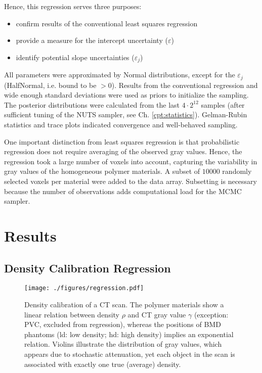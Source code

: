 Hence, this regression serves three purposes:
\begin{itemize}
\item confirm results of the conventional least squares regression
\item provide a measure for the intercept uncertainty (\(\varepsilon\))
\item identify potential slope uncertainties (\(\varepsilon_{j}\))
\end{itemize}


All parameters were approximated by Normal distributions, except for the \(\varepsilon_{j}\) (HalfNormal, i.e. bound to be \(>0\)).
Results from the conventional regression and wide enough standard deviations were used as priors to initialize the sampling.
The posterior distributions were calculated from the last \(4\cdot 2^{12}\) samples (after sufficient tuning of the NUTS sampler, see Ch. \ref{cpt:statistics}).
Gelman-Rubin statistics and trace plots indicated convergence and well-behaved sampling.


One important distinction from least squares regression is that probabilistic regression does not require averaging of the observed gray values.
Hence, the regression took a large number of voxels into account, capturing the variability in gray values of the homogeneous polymer materials.
A subset of \(10000\) randomly selected voxels per material were added to the data array.
Subsetting is necessary because the number of observations adds computational load for the MCMC sampler.


\clearpage
\section{Results}
\label{sec:orgb5c3aca}
\subsection{Density Calibration Regression}
\label{sec:org2d6967f}
\begin{figure}[p]
\centering
\texttt{[image: ./figures/regression.pdf]}
\caption{\label{fig:density_calibration}Density calibration of a CT scan. The polymer materials show a linear relation between density \(\rho\) and CT gray value \(\gamma\) (exception: PVC, excluded from regression), whereas the positions of BMD phantoms (ld: low density; hd: high density) implies an exponential relation. Violins illustrate the distribution of gray values, which appears due to stochastic attenuation, yet each object in the scan is associated with exactly one true (average) density.}
\end{figure}

